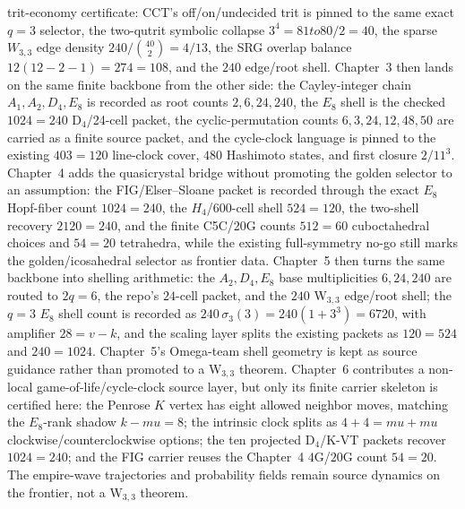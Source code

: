 \documentclass[12pt,a4paper]{article}
\def\mu{mu}%
\def\cdot{ }%
\def\to{ to }%
\theoremstyle{definition}
\begin{document}
trit-economy certificate: CCT's off/on/undecided trit is pinned to the
same exact $q=3$ selector, the two-qutrit symbolic collapse
$3^4=81\to 80/2=40$, the sparse $W_{3,3}$ edge density
$240/\binom{40}{2}=4/13$, the SRG overlap balance
$12(12-2-1)=27\cdot4=108$, and the $240$ edge/root shell.
Chapter~3 then lands on the same finite backbone from the other side:
the Cayley-integer chain $A_1,A_2,D_4,E_8$ is recorded as
root counts $2,6,24,240$, the $E_8$ shell is the checked
$10\cdot24=240$ D$_4$/24-cell packet, the cyclic-permutation counts
$6,3,24,12,48,50$ are carried as a finite source packet, and the
cycle-clock language is pinned to the existing $40\cdot3=120$
line-clock cover, $480$ Hashimoto states, and first closure
$2/11^3$.
Chapter~4 adds the quasicrystal bridge without promoting the golden
selector to an assumption: the FIG/Elser--Sloane packet is recorded
through the exact $E_8$ Hopf-fiber count $10\cdot24=240$, the
$H_4$/600-cell shell $5\cdot24=120$, the two-shell recovery
$2\cdot120=240$, and the finite C5C/20G counts
$5\cdot12=60$ cuboctahedral choices and $5\cdot4=20$
tetrahedra, while the existing full-symmetry no-go still marks the
golden/icosahedral selector as frontier data.
Chapter~5 then turns the same backbone into shelling arithmetic:
the $A_2,D_4,E_8$ base multiplicities $6,24,240$ are routed to
$2q=6$, the repo's $24$-cell packet, and the $240$ W$_{3,3}$
edge/root shell; the $q=3$ $E_8$ shell count is recorded as
$240\,\sigma_3(3)=240(1+3^3)=6720$, with amplifier
$28=v-k$, and the scaling layer splits the existing packets as
$120=5\cdot24$ and $240=10\cdot24$.  Chapter~5's
Omega-team shell geometry is kept as source guidance rather than
promoted to a W$_{3,3}$ theorem.
Chapter~6 contributes a non-local game-of-life/cycle-clock source
layer, but only its finite carrier skeleton is certified here: the
Penrose $K$ vertex has eight allowed neighbor moves, matching the
$E_8$-rank shadow $k-\mu=8$; the intrinsic clock splits as
$4+4=\mu+\mu$ clockwise/counterclockwise options; the ten projected
D$_4$/K-VT packets recover $10\cdot24=240$; and the FIG carrier
reuses the Chapter~4 $4$G/$20$G count $5\cdot4=20$.  The
empire-wave trajectories and probability fields remain source
dynamics on the frontier, not a W$_{3,3}$ theorem.
\end{document}
